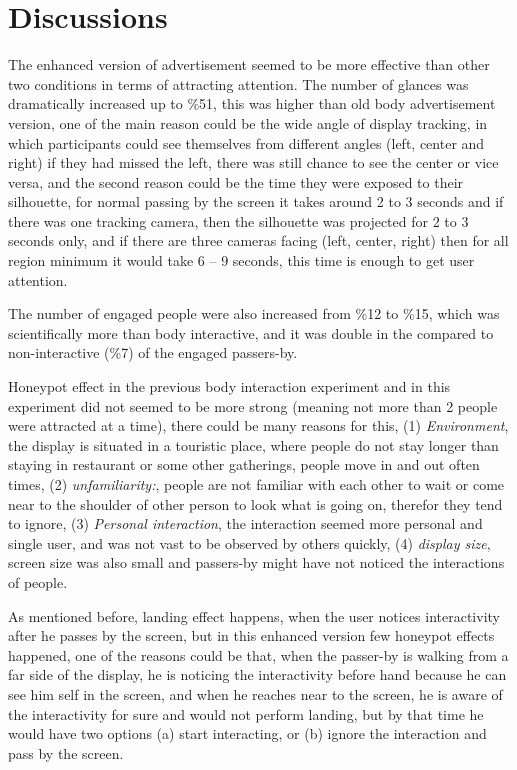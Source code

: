 \section{Discussions}

The enhanced version of advertisement seemed to be more effective than other two conditions in terms of attracting attention. The number of glances was dramatically increased up to \%51, this was higher than old body advertisement version, one of the main reason could be the wide angle of display tracking, in which participants could see themselves from different angles (left, center and right) if they had missed the left, there was still chance to see the center or vice versa, and the second reason could be the time they were exposed to their silhouette, for normal passing by the screen it takes around 2 to 3 seconds and if there was one tracking camera, then the silhouette was projected for 2 to 3 seconds only, and if there are three cameras facing (left, center, right) then for all region minimum it would take 6 – 9 seconds, this time is enough to get user attention.

The number of engaged people were also increased from \%12 to \%15, which was scientifically more than body interactive, and it was double in the compared to non-interactive (\%7) of the engaged passers-by. 



Honeypot effect in the previous body interaction experiment and in this experiment did not seemed to be more strong (meaning not more than 2 people were attracted at a time), there could be many reasons for this, (1) \emph{Environment}, the display is situated in a touristic place, where people do not stay longer than staying in restaurant or some other gatherings, people move in and out often times, (2) \emph{unfamiliarity:}, people are not familiar with each other to wait or come near to the shoulder of other person to look what is going on, therefor they tend to ignore, (3) \emph{Personal interaction}, the interaction seemed more personal and single user,  and was not vast to be observed by others quickly, (4) \emph{display size}, screen size was also small and passers-by might have not noticed the interactions of people.


As mentioned before, landing effect happens, when the user notices interactivity after he passes by the screen, but in this enhanced version few honeypot effects happened, one of the reasons could be that, when the passer-by is walking from a far side of the display, he is noticing the interactivity before hand because he can see him self in the screen, and when he reaches near to the screen, he is aware of the interactivity for sure and would not perform landing, but by that time he would have two options (a) start interacting, or (b) ignore the interaction and pass by the screen.



